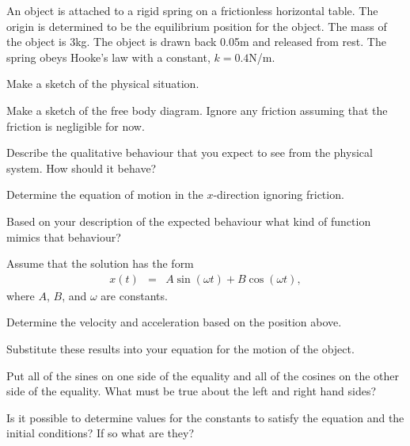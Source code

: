 \begin{problem}

\item An object is attached to a rigid spring on a frictionless
  horizontal table. The origin is determined to be the equilibrium
  position for the object. The mass of the object is 3kg. The object
  is drawn back 0.05m and released from rest. The spring obeys Hooke's
  law with a constant, $k=0.4$N/m.
  \begin{subproblem}
    \item Make a sketch of the physical situation.
      \vfill
    \item Make a sketch of the free body diagram. Ignore any friction
      assuming that the friction is negligible for now.
      \vfill
    \item Describe the qualitative behaviour that you expect to see
      from the physical system. How should it behave?
      \vfill
    \item Determine the equation of motion in the $x$-direction
      ignoring friction.
      \vfill

    \item Based on your description of the expected behaviour what
      kind of function mimics that behaviour?
      \vspace{3em}

      \clearpage

    \item Assume that the solution has the form
      \begin{eqnarray*}
        x(t) & = & A \sin(\omega t) + B \cos(\omega t),
      \end{eqnarray*}
      where $A$, $B$, and $\omega$ are constants.
      \begin{subproblem}
      \item Determine the velocity and acceleration based on the
        position above.
        \vfill
      \item Substitute these results into your equation for the motion
        of the object.
        \vfill
        \clearpage
      \item Put all of the sines on one side of the equality and all
        of the cosines on the other side of the equality. What must be
        true about the left and right hand sides?
        \vspace{6em}
      \item Is it possible to determine values for the constants to
        satisfy the equation and the initial conditions? If so what
        are they?
        \vfill
      \end{subproblem}

  \end{subproblem}
\end{problem}


